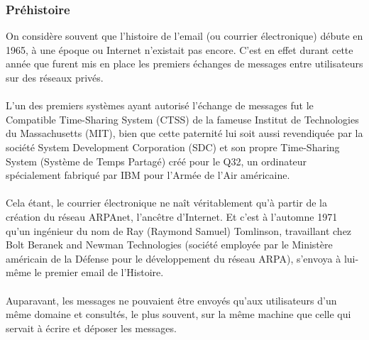 \documentclass[french]{report}
\begin{document}
\begin{titlepage}
\subsubsection{\LARGE Préhistoire}
\LARGE On considère souvent que l’histoire de l’email (ou courrier électronique) débute en 1965, à une époque ou Internet n’existait pas encore. C’est en effet durant cette année que furent mis en place les premiers échanges de messages entre utilisateurs sur des réseaux privés.\\ \\
L’un des premiers systèmes ayant autorisé l’échange de messages fut le Compatible Time-Sharing System (CTSS) de la fameuse Institut de Technologies du Massachusetts (MIT), bien que cette paternité lui soit aussi revendiquée par la société System Development Corporation (SDC) et son propre Time-Sharing System (Système de Temps Partagé) créé pour le Q32, un ordinateur spécialement fabriqué par IBM pour l’Armée de l’Air américaine.\\ \\
Cela étant, le courrier électronique ne naît véritablement qu’à partir de la création du réseau ARPAnet, l’ancêtre d’Internet. Et c’est à l’automne 1971 qu’un ingénieur du nom de Ray (Raymond Samuel) Tomlinson, travaillant chez Bolt Beranek and Newman Technologies (société employée par le Ministère américain de la Défense pour le développement du réseau ARPA), s’envoya à lui-même le premier email de l’Histoire.\\ \\
Auparavant, les messages ne pouvaient être envoyés qu’aux utilisateurs d’un même domaine et consultés, le plus souvent, sur la même machine que celle qui servait à écrire et déposer les messages.

\end{titlepage}
\end{document}
